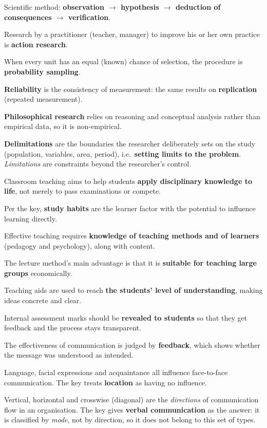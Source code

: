 Scientific method: \textbf{observation $\rightarrow$ hypothesis $\rightarrow$ deduction of consequences $\rightarrow$ verification}.

Research by a practitioner (teacher, manager) to improve his or her own practice is \textbf{action research}.

When every unit has an equal (known) chance of selection, the procedure is \textbf{probability sampling}.

\textbf{Reliability} is the consistency of measurement: the same results on \textbf{replication} (repeated measurement).

\textbf{Philosophical research} relies on reasoning and conceptual analysis rather than empirical data, so it is non-empirical.

\textbf{Delimitations} are the boundaries the researcher deliberately sets on the study (population, variables, area, period), i.e.\ \textbf{setting limits to the problem}. \emph{Limitations} are constraints beyond the researcher's control.

Classroom teaching aims to help students \textbf{apply disciplinary knowledge to life}, not merely to pass examinations or compete.

Per the key, \textbf{study habits} are the learner factor with the potential to influence learning directly.

Effective teaching requires \textbf{knowledge of teaching methods and of learners} (pedagogy and psychology), along with content.

The lecture method's main advantage is that it is \textbf{suitable for teaching large groups} economically.

Teaching aids are used to reach \textbf{the students' level of understanding}, making ideas concrete and clear.

Internal assessment marks should be \textbf{revealed to students} so that they get feedback and the process stays transparent.

The effectiveness of communication is judged by \textbf{feedback}, which shows whether the message was understood as intended.

Language, facial expressions and acquaintance all influence face-to-face communication. The key treats \textbf{location} as having no influence.

Vertical, horizontal and crosswise (diagonal) are the \emph{directions} of communication flow in an organisation. The key gives \textbf{verbal communication} as the answer: it is classified by \emph{mode}, not by direction, so it does not belong to this set of types.

